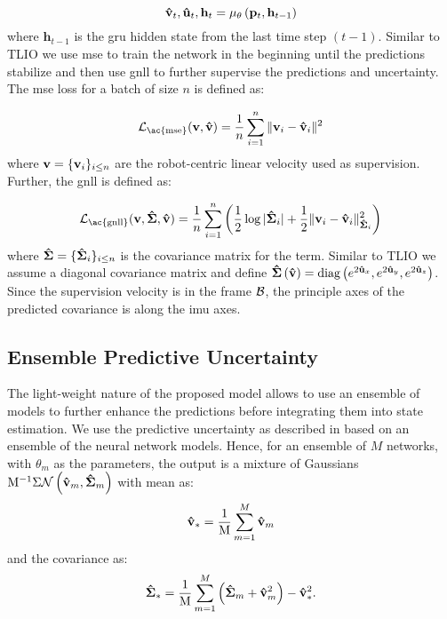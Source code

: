 \begin{equation}
    \mathbf{\hat{v}}_{t}, \mathbf{\hat{u}}_{t}, \mathbf{h}_{t}=\mu_{\theta}\left(\mathbf{p}_{t}, \mathbf{h}_{t-1}\right)
\end{equation}
where $\mathbf{h}_{t-1}$ is the \ac{gru} hidden state from the last time step $(t-1)$. Similar to TLIO \cite{liuTLIOTightLearned2020a} we use \ac{mse} to train the network in the beginning until the predictions stabilize and then use \ac{gnll} to further supervise the predictions and uncertainty. The \ac{mse} loss for a batch of size $n$ is defined as:

\begin{equation}
    \mathcal{L}_{\mathrm{\ac{mse}}}(\vel,\velpred)=\frac{1}{n}\sum_{i=1}^{n}\|\vel_{i} - \velpred_{i}\|^{2}
\end{equation}
where $\mathbf{v}=\{\mathbf{v}_{i}\}_{i\leq{n}}$ are the robot-centric linear velocity used as supervision. Further, the \ac{gnll} is defined as:

\begin{equation}
    \mathcal{L}_{\mathrm{\ac{gnll}}}(\vel, \sigmapred, \velpred)=\frac{1}{n}\sum_{i=1}^{n}\left(\frac{1}{2}\log{|{\sigmapred_{i}}|}+\frac{1}{2}\|\vel_{i}-\velpred_{i}\|^{2}_{\sigmapred_{i}}\right)
\end{equation}
 where $\mathbf{\hat{\Sigma}}=\{\mathbf{\hat{\Sigma}}_{i}\}_{i\leq{n}}$ is the covariance matrix for the term. Similar to TLIO \cite{liuTLIOTightLearned2020a} we assume a diagonal covariance matrix and define $\mathbf{\hat{\Sigma}}\left(\mathbf{\hat{v}}\right)=\textrm{diag}\left(e^{2\mathbf{\hat{u}}_{x}}, e^{2\mathbf{\hat{u}}_{y}}, e^{2\mathbf{\hat{u}}_{z}}\right)$. Since the supervision velocity is in the frame $\mathcal{B}$, the principle axes of the predicted covariance is along the \ac{imu} axes.
 
\subsection{Ensemble Predictive Uncertainty} The light-weight nature of the proposed model allows to use an ensemble of models to further enhance the predictions before integrating them into state estimation. We use the predictive uncertainty as described in \cite{lakshminarayananSimpleScalablePredictive2017} based on an ensemble of the neural network models. Hence, for an ensemble of $M$ networks, with $\theta_{m}$ as the parameters, the output is a mixture of Gaussians $\mathrm{M}^{-1}\Sigma\mathcal{N}\left(\mathbf{\hat{v}}_{m}, \mathbf{\hat{\Sigma}}_{m}\right)$ with mean as:
\begin{equation}
    \mathbf{\hat{v}}_{*}=\frac{1}{\mathrm{M}}\sum_{m=1}^{M}\mathbf{\hat{v}}_{m}
\end{equation}
 and the covariance as:
 \begin{equation}
     \mathbf{\hat{\Sigma}}_{*}=\frac{1}{\mathrm{M}}\sum_{m=1}^{M}\left(\mathbf{\hat{\Sigma}}_{m}+\mathbf{\hat{v}}_{m}^{2}\right)-\mathbf{\hat{v}}_{*}^{2}.
 \end{equation}

